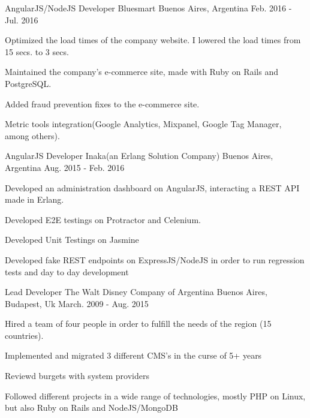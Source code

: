 \begin{cventries}
  \cventry
    {AngularJS/NodeJS Developer} %
    {Bluesmart} %
    {Buenos Aires, Argentina} %
    {Feb. 2016 - Jul. 2016} %
    {
      \begin{cvitems} %
        \item {Optimized the load times of the company website. I lowered the load times from 15 secs. to 3 secs.}
        \item {Maintained the company's e-commerce site, made with Ruby on Rails and PostgreSQL.}
        \item {Added fraud prevention fixes to the e-commerce site.}
        \item {Metric tools integration(Google Analytics, Mixpanel, Google Tag Manager, among others).}
      \end{cvitems}
    }

  \cventry
    {AngularJS Developer} %
    {Inaka(an Erlang Solution Company)} %
    {Buenos Aires, Argentina} %
    {Aug. 2015 - Feb. 2016} %
    {
      \begin{cvitems} %
       \item {Developed an administration dashboard on AngularJS, interacting a REST API made in Erlang.}
       \item {Developed E2E testings on Protractor and Celenium.}
       \item {Developed Unit Testings on Jasmine}
       \item {Developed fake REST endpoints on ExpressJS/NodeJS in order to run regression tests and day to day development}
      \end{cvitems}
    }
  \cventry
    {Lead Developer} %
    {The Walt Disney Company of Argentina} %
    {Buenos Aires, Budapest, Uk} %
    {March. 2009 - Aug. 2015} %
    {
      \begin{cvitems} %
        \item {Hired a team of four people in order to fulfill the needs of the region (15 countries).}
        \item {Implemented and migrated 3 different CMS's in the curse of 5+ years}
        \item {Reviewd burgets with system providers}
        \item {Followed different projects in a wide range of technologies, mostly PHP on Linux, but also Ruby on Rails and NodeJS/MongoDB}
      \end{cvitems}
    }


\end{cventries}
